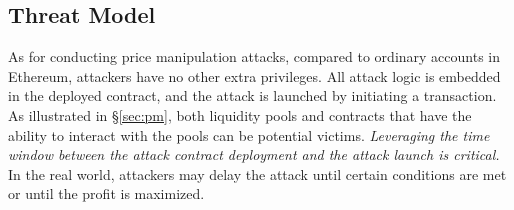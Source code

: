 \subsection{Threat Model}

As for conducting price manipulation attacks, compared to ordinary accounts in Ethereum, attackers have no other extra privileges. All attack logic is embedded in the deployed contract, and the attack is launched by initiating a transaction.
As illustrated in \S\ref{sec:pm}, both liquidity pools and contracts that have the ability to interact with the pools can be potential victims.
\textit{Leveraging the time window between the attack contract deployment and the attack launch is critical.} In the real world, attackers may delay the attack until certain conditions are met or until the profit is maximized. 